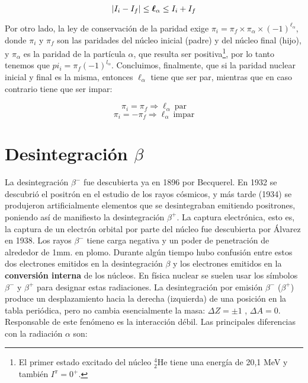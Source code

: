 \begin{mybox}
\begin{equation}
    |I_i-I_f|\leq \boldsymbol{\ell}_\alpha \leq I_i + I_f
\end{equation}
\end{mybox}
Por otro lado, la ley de conservación de la paridad exige $\pi_i=\pi_f \times \pi_\alpha \times (-1)^{\ell_\alpha}$, donde $\pi_i$ y $\pi_f$ son las paridades del núcleo inicial (padre) y del núcleo final (hijo), y $\pi_\alpha$ es la paridad de la partícula $\alpha$, que resulta ser positiva\footnote{El primer estado excitado del núcleo $^4_2$He tiene una energía de 20,1 MeV y también $I^\pi = 0^+$.}, por lo tanto tenemos que $pi_i = \pi_f (-1)^{l_\alpha}$. Concluimos, finalmente, que si la paridad nuclear inicial y final es la misma, entonces $\ell_\alpha$ tiene que ser par, mientras que en caso contrario tiene que ser impar:

\begin{equation}
    \pi_i = \pi_f \Longrightarrow \ell_\alpha \ \text{par}
\end{equation}
\begin{equation*}
    \pi_i = - \pi_f \Longrightarrow \ell_\alpha \ \text{impar}
\end{equation*}



\section{Desintegración $\beta$}

La desintegración $\beta^-$ fue descubierta ya en 1896 por Becquerel. En 1932 se descubrió el positrón en el estudio de los rayos cósmicos, y más tarde (1934) se produjeron artificialmente elementos que se desintegraban emitiendo positrones, poniendo así de manifiesto la desintegración $\beta^+$. La captura electrónica, esto es, la captura de un electrón orbital por parte del núcleo fue descubierta por Álvarez en 1938. Los rayos $\beta^-$ tiene carga negativa y un poder de penetración de alrededor de 1mm. en plomo. Durante algún tiempo hubo confusión entre estos dos electrones emitidos en la desintegración $\beta$ y los electrones emitidos en la \textbf{conversión interna} de los núcleos. En física nuclear se suelen usar los símbolos $\beta^-$ y $\beta^+$ para designar estas radiaciones. La desintegración por emisión $\beta^-$ ($\beta^+$) produce un desplazamiento hacia la derecha (izquierda) de una posición en la tabla periódica, pero no cambia esencialmente la masa: $\Delta Z= \pm 1$ , $\Delta A = 0$. Responsable de este fenómeno es la interacción débil. Las principales diferencias con la radiación $\alpha$ son:

